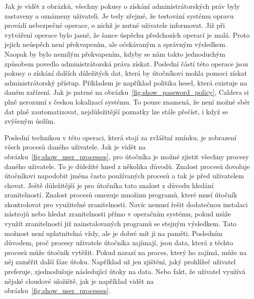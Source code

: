 Jak je vidět z obrázků, všechny pokusy o získání administrátorských práv byly zastaveny a oznámeny uživateli.
Je tedy zřejmé, že testování systému opravu provádí nebezpečné operace, o nichž je nutné uživatele informovat.
Již při vytváření operace bylo jasné, že šance úspěchu předchozích operací je malá.
Proto jejich neúspěch není překvapením, ale očekávaným a správným výsledkem.
Naopak by bylo nemilým překvapením, kdyby se nám takto jednoduchým způsobem povedlo administrátorská práva získat.
Poslední částí této operace jsou pokusy o získání dalších důležitých dat, která by útočníkovi mohla pomoci získat administrátorský přístup.
Příkladem je například politika hesel, která existuje na daném zařízení.
Jak je patrné na obrázku~\ref{fig:show_password_policy}, Caldera si plně nerozumí s českou lokalizací systému.
To pouze znamená, že není možné sběr dat plně zautomatizovat, nejdůležitější poznatky lze stále přečíst, i když se zvýšeným úsilím.


Poslední technikou v této operaci, která stojí za zvláštní zmínku, je zobrazení všech procesů daného uživatele.
Jak je vidět na obrázku~\ref{fig:show_user_processes}, pro útočníka je možné zjistit všechny procesy daného uživatele.
To je důležité hned z několika důvodů.
Znalost procesů dovoluje útočníkovi napodobit jména často používaných procesů a tak je před uživatelem chovat.
Ještě důležitější je pro útočníka tato znalost z důvodu hledání zranitelností.
Znalost procesů omezuje množinu programů, které musí útočník zkontrolovat pro využitelné zranitelnosti.
Navíc nemusí řešit dodatečnou instalaci nástrojů nebo hledat zranitelnosti přímo v operačním systému, pokud může využít zranitelností již nainstalovaných programů se stejným výsledkem.
Tato možnost není uplatnitelná vždy, ale je dobré mít ji na paměti.
Posledním důvodem, proč procesy uživatele útočníka zajímají, jsou data, která z těchto procesů může útočník vytěžit.
Pokud narazí na proces, který ho zajímá, může na něj zaměřit další fáze útoku.
Například už jen zjištění, jaký prohlížeč uživatel preferuje, zjednodušuje následující útoky na data.
Nebo fakt, že uživatel využívá nějaké cloudové uložiště, jak je například vidět na obrázku~\ref{fig:show_user_processes}.



